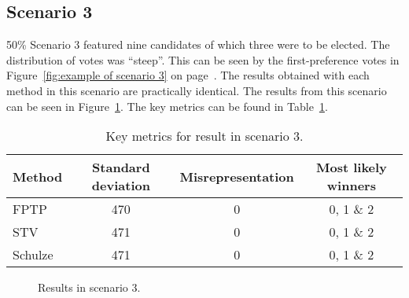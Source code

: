 \documentclass[12pt]{article}
\begin{document}
\subsection{Scenario 3} 50\%
\label{sec:resuls-scenario3}
Scenario 3 featured nine candidates of which three were to be elected. The distribution of votes was  ``steep''. This can be seen by the first-preference votes in Figure~\ref{fig:example of scenario 3} on page~\pageref{fig:example of scenario 3}. The results obtained with each method in this scenario are practically identical. The results from this scenario can be seen in Figure~\ref{fig:scenario 3 result}. The key metrics can be found in Table~\ref{tab:scenario 3 result}.
\begin{table}[H]
	\centering
	\caption{Key metrics for result in scenario 3.}
\label{tab:scenario 3 result}
	\begin{tabular}{@{}lccc@{}}
		\toprule
		Method & Standard deviation & Misrepresentation & Most likely winners \\ \midrule
		FPTP & 470 & 0 & 0, 1 \& 2 \\
		STV & 471 & 0 & 0, 1 \& 2 \\
		Schulze & 471 & 0 & 0, 1 \& 2  \\ \bottomrule
	\end{tabular}
\end{table}
\begin{figure}[H]
	\centering
	\caption{Results in scenario 3.}
\label{fig:scenario 3 result}
\end{figure}
\end{document}
